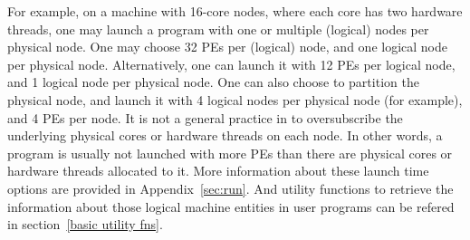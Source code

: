 For example, on a machine with 16-core nodes, where each core has two
hardware threads, one may launch a \charmpp{} program with one or multiple
(logical) nodes per physical node. One may choose 32 PEs per (logical) node,
and one logical node per physical node. Alternatively, one can launch
it with 12 PEs per logical node, and 1 logical node per physical
node. One can also choose to partition the physical node, and launch
it with 4 logical nodes per physical node (for example), and 4 PEs per
node. It is not a general practice in \charmpp{} to oversubscribe the underlying
physical cores or hardware threads on each node. In other words, a
\charmpp{} program is usually not launched with more PEs than there
are physical cores or hardware threads allocated to it. More information about
these launch time options are provided in Appendix~\ref{sec:run}.
And utility functions to retrieve the information about those
\charmpp{} logical machine entities in user programs can be refered
in section~\ref{basic utility fns}.
